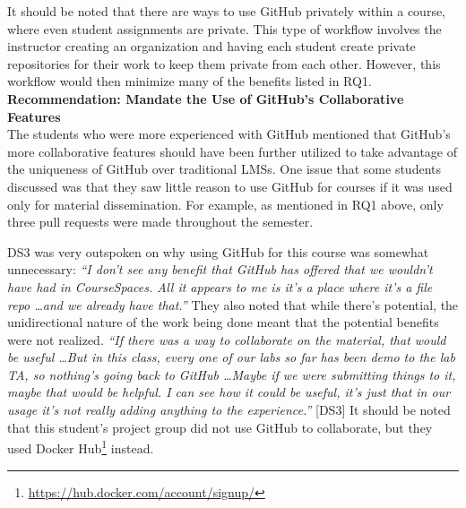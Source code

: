 It should be noted that there are ways to use GitHub privately within a course, where even student assignments are private. This type of workflow involves the instructor creating an organization and having each student create private repositories for their work to keep them private from each other. However, this workflow would then minimize many of the benefits listed in RQ1. \\


\textbf{Recommendation: Mandate the Use of GitHub's Collaborative Features} \\
The students who were more experienced with GitHub mentioned that GitHub's more collaborative features should have been further utilized to take advantage of the uniqueness of GitHub over traditional LMSs. One issue that some students discussed was that they saw little reason to use GitHub for courses if it was used only for material dissemination. For example, as mentioned in RQ1 above, only three pull requests were made throughout the semester.

DS3 was very outspoken on why using GitHub for this course was somewhat unnecessary: \textit{``I don't see any benefit that GitHub has offered that we wouldn't have had in CourseSpaces. All it appears to me is it's a place where it's a file repo \ldots and we already have that.''} They also noted that while there's potential, the unidirectional nature of the work being done meant that the potential benefits were not realized. \textit{``If there was a way to collaborate on the material, that would be useful \ldots But in this class, every one of our labs so far has been demo to the lab TA, so nothing's going back to GitHub \ldots Maybe if we were submitting things to it, maybe that would be helpful. I can see how it could be useful, it's just that in our usage it's not really adding anything to the experience.''} [DS3] It should be noted that this student's project group did not use GitHub to collaborate, but they used Docker Hub\footnote{\url{https://hub.docker.com/account/signup/}} instead.

